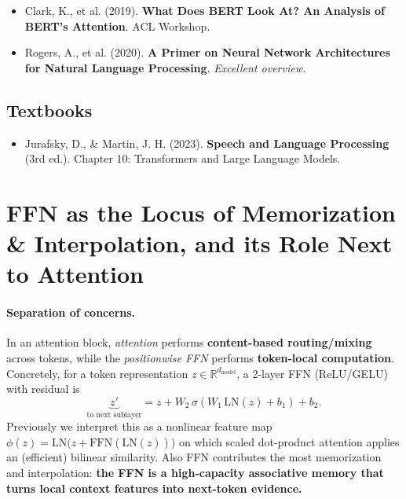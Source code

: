 \documentclass{article}
\begin{document}
\begin{itemize}
\item Clark, K., et al. (2019). \textbf{What Does BERT Look At? An Analysis of BERT's Attention}. ACL Workshop.

\item Rogers, A., et al. (2020). \textbf{A Primer on Neural Network Architectures for Natural Language Processing}. \textit{Excellent overview.}
\end{itemize}

\subsection{Textbooks}

\begin{itemize}

\item Jurafsky, D., \& Martin, J. H. (2023). \textbf{Speech and Language Processing} (3rd ed.). Chapter 10: Transformers and Large Language Models.
\end{itemize}


\section*{FFN as the Locus of Memorization \& Interpolation, and its Role Next to Attention}

\paragraph{Separation of concerns.}
In an attention block, \emph{attention} performs \textbf{content-based routing/mixing} across tokens, while the \emph{positionwise FFN} performs \textbf{token-local computation}. Concretely, for a token representation $z\in\mathbb{R}^{d_{\mathrm{model}}}$, a 2-layer FFN (ReLU/GELU) with residual is
\[
\underbrace{z'}_{\text{to next sublayer}}
= z + W_2\,\sigma(W_1\,\mathrm{LN}(z)+b_1)+b_2.
\]
Previously we interpret this as a nonlinear feature map $\phi(z)=\mathrm{LN}\!\big(z+ \mathrm{FFN}(\mathrm{LN}(z))\big)$ on which scaled dot-product attention applies an (efficient) bilinear similarity. Also FFN contributes the most memorization and interpolation: \textbf{the FFN is a high-capacity associative memory that turns local context features into next-token evidence.}
\end{document}
